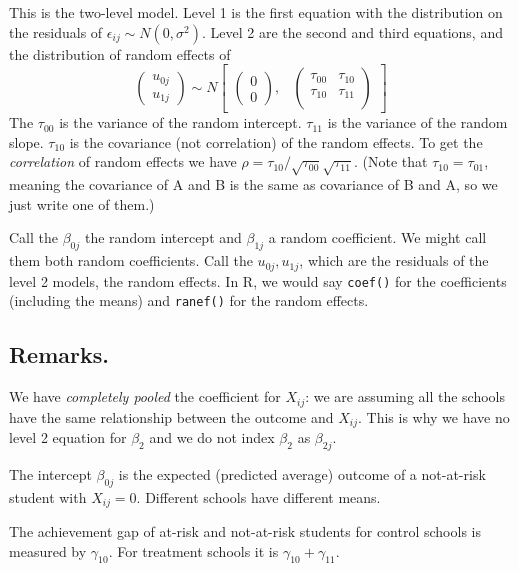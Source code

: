 \documentclass[
  letterpaper,
  DIV=11,
  numbers=noendperiod]{scrreprt}
\begin{document}
This is the two-level model. Level 1 is the first equation with the
distribution on the residuals of
\(\epsilon_{ij} \sim N( 0, \sigma^2 )\). Level 2 are the second and
third equations, and the distribution of random effects of \[
\begin{pmatrix} u_{0j} \\
u_{1j}
\end{pmatrix} \sim  N
\begin{bmatrix}
\begin{pmatrix}
0 \\
0
\end{pmatrix}\!\!,&
\begin{pmatrix}
\tau_{00} & \tau_{10} \\
\tau_{10} & \tau_{11} \\
\end{pmatrix}
\end{bmatrix}
\] The \(\tau_{00}\) is the variance of the random intercept.
\(\tau_{11}\) is the variance of the random slope. \(\tau_{10}\) is the
covariance (not correlation) of the random effects. To get the
\emph{correlation} of random effects we have
\(\rho = \tau_{10} / \sqrt{ \tau_{00} } \sqrt{ \tau_{11} }\). (Note that
\(\tau_{10} = \tau_{01}\), meaning the covariance of A and B is the same
as covariance of B and A, so we just write one of them.)

Call the \(\beta_{0j}\) the random intercept and \(\beta_{1j}\) a random
coefficient. We might call them both random coefficients. Call the
\(u_{0j}, u_{1j}\), which are the residuals of the level 2 models, the
random effects. In R, we would say \texttt{coef()} for the coefficients
(including the means) and \texttt{ranef()} for the random effects.

\subsection{Remarks.}\label{remarks.-2}

We have \emph{completely pooled} the coefficient for \(X_{ij}\): we are
assuming all the schools have the same relationship between the outcome
and \(X_{ij}\). This is why we have no level 2 equation for
\(\beta_{2}\) and we do not index \(\beta_2\) as \(\beta_{2j}\).

The intercept \(\beta_{0j}\) is the expected (predicted average) outcome
of a not-at-risk student with \(X_{ij} = 0\). Different schools have
different means.

The achievement gap of at-risk and not-at-risk students for control
schools is measured by \(\gamma_{10}\). For treatment schools it is
\(\gamma_{10} + \gamma_{11}\).
\end{document}
